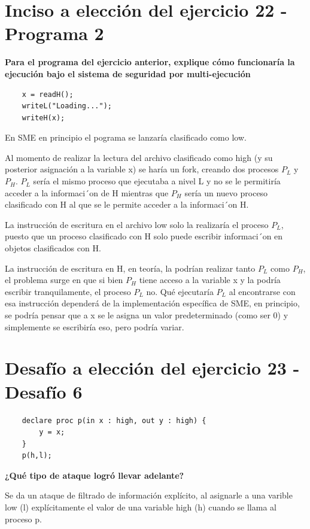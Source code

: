 \documentclass[11pt]{article}
\begin{document}
\section*{Inciso a elección del ejercicio 22 - Programa 2}
\textbf{Para el programa del ejercicio anterior, explique cómo funcionaría la ejecución bajo el
sistema de seguridad por multi-ejecución}

\begin{lstlisting}
    x = readH();
    writeL("Loading...");
    writeH(x);
\end{lstlisting}

En SME en principio el pograma se lanzaría clasificado como low. 

Al momento de realizar la lectura del archivo clasificado como high (y su posterior asignación a la variable x) se haría un fork, creando dos procesos $P_L$ y $P_H$.
$P_L$ sería el mismo proceso que ejecutaba a nivel L y no se le permitiría acceder a la informaci´on de H mientras que $P_H$ sería un
nuevo proceso clasificado con H al que se le permite acceder a la informaci´on H. 

La instrucción de escritura en el archivo low solo la realizaría el proceso $P_L$, puesto que un proceso clasificado con H solo puede escribir informaci´on en objetos clasificados con H. 

La instrucción de escritura en H, en teoría, la podrían realizar tanto $P_L$ como $P_H$, el problema surge en que si bien $P_H$ tiene acceso a la variable x y la podría escribir tranquilamente, el proceso $P_L$ no.
Qué ejecutaría $P_L$ al encontrarse con esa instrucción dependerá de la implementación específica de SME, en principio, se podría pensar que a x se le asigna un valor predeterminado (como ser 0) y simplemente se escribiría eso, pero 
podría variar.


\section*{Desafío a elección del ejercicio 23 - Desafío 6}

\begin{lstlisting}
    declare proc p(in x : high, out y : high) {
        y = x;
    }
    p(h,l);
\end{lstlisting}

\textbf{¿Qué tipo de ataque logró llevar adelante?}

Se da un ataque de filtrado de información explícito, al asignarle a una varible low (l) explícitamente el valor de una variable high (h) cuando se llama al proceso p.
\end{document}
